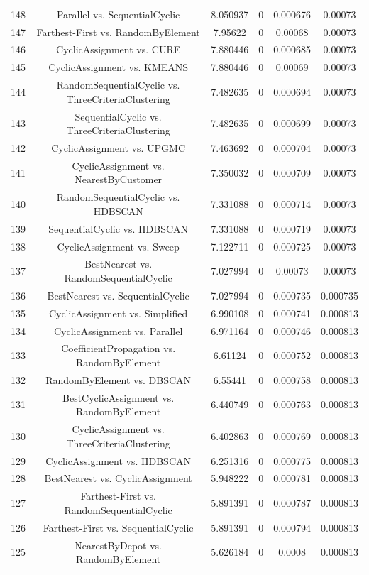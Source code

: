 \documentclass[a4paper,10pt]{article}
\begin{document}
\begin{landscape}
\begin{table}[!htp]
\begin{tabular}{cccccc}
148&Parallel vs. SequentialCyclic&8.050937&0&0.000676&0.00073\\
147&Farthest-First vs. RandomByElement&7.95622&0&0.00068&0.00073\\
146&CyclicAssignment vs. CURE&7.880446&0&0.000685&0.00073\\
145&CyclicAssignment vs. KMEANS&7.880446&0&0.00069&0.00073\\
144&RandomSequentialCyclic vs. ThreeCriteriaClustering&7.482635&0&0.000694&0.00073\\
143&SequentialCyclic vs. ThreeCriteriaClustering&7.482635&0&0.000699&0.00073\\
142&CyclicAssignment vs. UPGMC&7.463692&0&0.000704&0.00073\\
141&CyclicAssignment vs. NearestByCustomer&7.350032&0&0.000709&0.00073\\
140&RandomSequentialCyclic vs. HDBSCAN&7.331088&0&0.000714&0.00073\\
139&SequentialCyclic vs. HDBSCAN&7.331088&0&0.000719&0.00073\\
138&CyclicAssignment vs. Sweep&7.122711&0&0.000725&0.00073\\
137&BestNearest vs. RandomSequentialCyclic&7.027994&0&0.00073&0.00073\\
136&BestNearest vs. SequentialCyclic&7.027994&0&0.000735&0.000735\\
135&CyclicAssignment vs. Simplified&6.990108&0&0.000741&0.000813\\
134&CyclicAssignment vs. Parallel&6.971164&0&0.000746&0.000813\\
133&CoefficientPropagation vs. RandomByElement&6.61124&0&0.000752&0.000813\\
132&RandomByElement vs. DBSCAN&6.55441&0&0.000758&0.000813\\
131&BestCyclicAssignment vs. RandomByElement&6.440749&0&0.000763&0.000813\\
130&CyclicAssignment vs. ThreeCriteriaClustering&6.402863&0&0.000769&0.000813\\
129&CyclicAssignment vs. HDBSCAN&6.251316&0&0.000775&0.000813\\
128&BestNearest vs. CyclicAssignment&5.948222&0&0.000781&0.000813\\
127&Farthest-First vs. RandomSequentialCyclic&5.891391&0&0.000787&0.000813\\
126&Farthest-First vs. SequentialCyclic&5.891391&0&0.000794&0.000813\\
125&NearestByDepot vs. RandomByElement&5.626184&0&0.0008&0.000813\\

\end{tabular}
\end{table}
\end{landscape}
\end{document}
